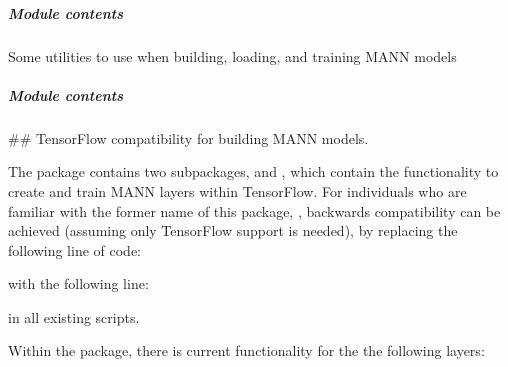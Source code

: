 \documentclass[letterpaper,10pt,english]{sphinxmanual}
\begin{document}
\subparagraph{Module contents}
\label{\detokenize{beyondml.tflow.utils:module-beyondml.tflow.utils}}\label{\detokenize{beyondml.tflow.utils:module-contents}}
\sphinxAtStartPar
Some utilities to use when building, loading, and training MANN models


\subparagraph{Module contents}
\label{\detokenize{beyondml.tflow:module-beyondml.tflow}}\label{\detokenize{beyondml.tflow:module-contents}}
\sphinxAtStartPar
\#\# TensorFlow compatibility for building MANN models.

\sphinxAtStartPar
The  package contains two subpackages,  and , which contain
the functionality to create and train MANN layers within TensorFlow. For individuals who are
familiar with the former name of this package, , backwards compatibility can be achieved
(assuming only TensorFlow support is needed), by replacing the following line of code:

\begin{sphinxVerbatim}[commandchars=\\\{\}]
 
\end{sphinxVerbatim}

\sphinxAtStartPar
with the following line:

\begin{sphinxVerbatim}[commandchars=\\\{\}]
   
\end{sphinxVerbatim}

\sphinxAtStartPar
in all existing scripts.

\sphinxAtStartPar
Within the  package, there is current functionality for the the following layers:
\sphinxhyphen{} 
\sphinxhyphen{} 
\sphinxhyphen{} 
\sphinxhyphen{} 
\sphinxhyphen{} 
\sphinxhyphen{} 
\sphinxhyphen{} 
\sphinxhyphen{} 
\sphinxhyphen{} 
\sphinxhyphen{} 
\sphinxhyphen{} 
\sphinxhyphen{} 
\sphinxhyphen{} 
\sphinxhyphen{} 
\end{document}
